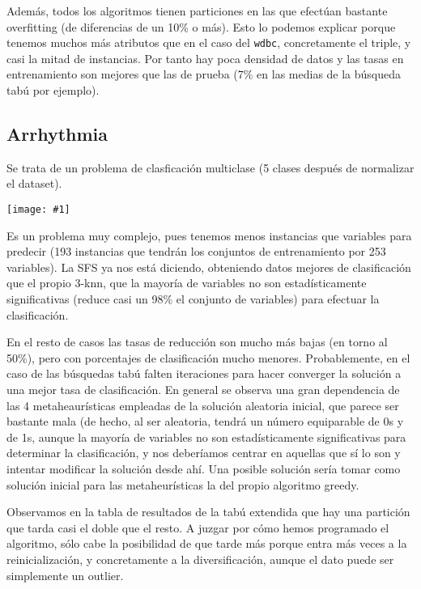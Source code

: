 \documentclass[a4paper,11pt]{article}
\newcommand{\imagen}[4]{
  \begin{minipage}{\linewidth}
    \centering
    \texttt{[image: \#1]}
    \captionof{figure}{#2}
    \label{#3}
  \end{minipage} 
}
\begin{document}
  Además, todos los algoritmos tienen particiones en las que efectúan bastante overfitting (de diferencias de un 10\% o más).
  Esto lo podemos explicar porque tenemos muchos más atributos que en el caso del \texttt{wdbc}, concretamente el triple, y
  casi la mitad de instancias. Por tanto hay poca densidad de datos y las tasas en entrenamiento son mejores que las de 
  prueba (7\% en las medias de la búsqueda tabú por ejemplo).
  
  \subsection{Arrhythmia}
  
  Se trata de un problema de clasficación multiclase (5 clases después de normalizar el dataset).
  
  \imagen{../data/trajectories/arrhythmia.png}{Tasas de clasificación en Arrhythmia}{wdbcgraph}{0.7}
  
  Es un problema muy complejo, pues tenemos menos instancias que variables para predecir (193 instancias que tendrán
  los conjuntos de entrenamiento por 253 variables). La SFS ya nos está diciendo, obteniendo datos mejores de clasificación
  que el propio 3-knn, que la mayoría de variables no son estadísticamente significativas (reduce casi un 98\% el conjunto de variables)
  para efectuar la clasificación.
  
  En el resto de casos las tasas de reducción son mucho más bajas (en torno al 50\%), pero con porcentajes de clasificación
  mucho menores. Probablemente, en el caso de las búsquedas tabú falten iteraciones para hacer converger la solución a una mejor
  tasa de clasificación. En general se observa una gran dependencia de las 4 metaheaurísticas empleadas de la solución aleatoria
  inicial, que parece ser bastante mala (de hecho, al ser aleatoria, tendrá un número equiparable de 0s y de 1s, aunque la mayoría
  de variables no son estadísticamente significativas para determinar la clasificación, y nos deberíamos centrar en aquellas
  que sí lo son y intentar modificar la solución desde ahí. Una posible solución sería tomar como solución inicial para las metaheurísticas
  la del propio algoritmo greedy.
  
  Observamos en la tabla de resultados de la tabú extendida que hay una partición que tarda casi el doble que el resto.
  A juzgar por cómo hemos programado el algoritmo, sólo cabe la posibilidad de que tarde más porque entra más veces a la
  reinicialización, y concretamente a la diversificación, aunque el dato puede ser simplemente un outlier.
  
\end{document}
